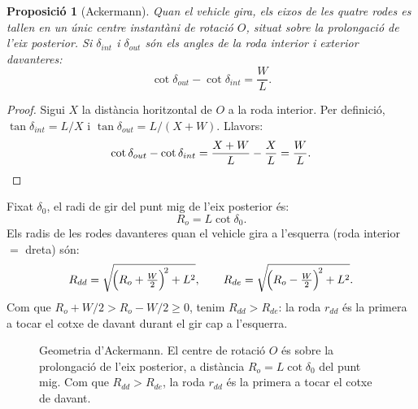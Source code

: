 \documentclass[11pt, a4paper]{article}
\theoremstyle{plain}
\newtheorem{proposition}[theorem]{Proposici\'o}
\theoremstyle{definition}
\newcommand{\Ro}{R_o}
\begin{document}
\begin{proposition}[Ackermann]\label{prop:ackermann}
Quan el vehicle gira, els eixos de les quatre rodes es tallen en un \'unic
centre instant\`ani de rotaci\'o $O$, situat sobre la prolongaci\'o de l'eix
posterior. Si $\delta_{int}$ i $\delta_{out}$ s\'on els angles de la roda
interior i exterior davanteres:
\[
  \cot\delta_{out} - \cot\delta_{int} = \frac{W}{L}.
\]
\end{proposition}

\begin{proof}
Sigui $X$ la dist\`ancia horitzontal de $O$ a la roda interior. Per
definici\'o, $\tan\delta_{int}=L/X$ i $\tan\delta_{out}=L/(X+W)$. Llavors:
\[
  \cot\delta_{out}-\cot\delta_{int}
  =\frac{X+W}{L}-\frac{X}{L}=\frac{W}{L}.\qedhere
\]
\end{proof}

Fixat $\delta_0$, el radi de gir del punt mig de l'eix posterior \'es:
\[
  \Ro = L\cot\delta_0.
\]
Els radis de les rodes davanteres quan el vehicle gira a l'esquerra
(roda interior $=$ dreta) s\'on:
\[
  R_{dd} = \sqrt{\!\Bigl(\Ro+\tfrac{W}{2}\Bigr)^{\!2}+L^2}, \qquad
  R_{de} = \sqrt{\!\Bigl(\Ro-\tfrac{W}{2}\Bigr)^{\!2}+L^2}.
\]
Com que $\Ro+W/2>\Ro-W/2\geq 0$, tenim $R_{dd}>R_{de}$: la roda $r_{dd}$
\'es la primera a tocar el cotxe de davant durant el gir cap a l'esquerra.

\begin{figure}[h]
\centering
{}
\caption{Geometria d'Ackermann. El centre de rotaci\'o $O$ \'es sobre la
prolongaci\'o de l'eix posterior, a dist\`ancia $\Ro=L\cot\delta_0$ del punt
mig. Com que $R_{dd}>R_{de}$, la roda $r_{dd}$ \'es la primera a tocar el
cotxe de davant.}
\label{fig:ackermann}
\end{figure}
\end{document}

